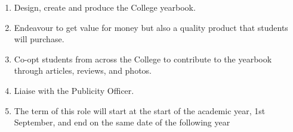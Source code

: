 \begin{enumerate}
    \item Design, create and produce the College yearbook.
    \item Endeavour to get value for money but also a quality product that students will purchase.
    \item Co-opt students from across the College to contribute to the yearbook through articles, reviews, and photos.
    \item Liaise with the Publicity Officer.
    \item The term of this role will start at the start of the academic year, 1st September, and end on the same date of the following year
    
\end{enumerate}






